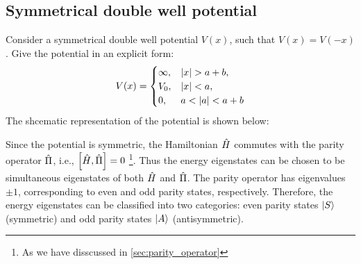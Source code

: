 \subsection{Symmetrical double well potential}
Consider a symmetrical double well potential $V(x)$, such that $V(x) = V(-x)$. Give the potential in an explicit form:
\begin{align}
    V(x) =\begin{cases}
        \infty, & \left| x \right| > a+b, \\
        V_0, &  \left| x \right| < a,\\
        0, & a < \left| a \right| < a+b \\
    \end{cases}
\end{align}
The shcematic representation of the potential is shown below:
\begin{figure}[!h]
    \centering
\end{figure}

Since the potential is symmetric, the Hamiltonian $\hat{H}$ commutes with the parity operator $\hat{\Pi}$, i.e., $\left[ \hat{H} , \hat{\Pi} \right] = 0$ \footnote{As we have disscussed in \cref{sec:parity_operator}}. Thus the energy eigenstates can be chosen to be simultaneous eigenstates of both $\hat{H}$ and $\hat{\Pi}$. The parity operator has eigenvalues $\pm 1$, corresponding to even and odd parity states, respectively. Therefore, the energy eigenstates can be classified into two categories: even parity states $\ket S$ (symmetric) and odd parity states $\ket A$ (antisymmetric).

